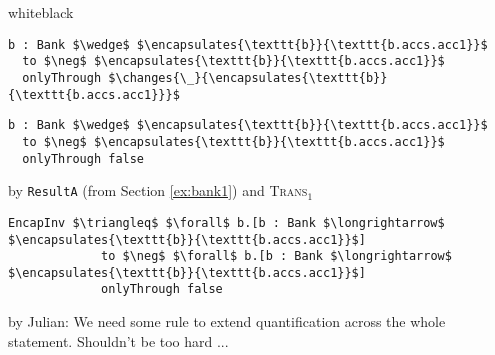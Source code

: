 \begin{proofBox}{white}{black}
\footnotesize
\begin{minipage}{0.75\textwidth}
\begin{lstlisting}[language = Chainmail, mathescape=true, frame=single]
b : Bank $\wedge$ $\encapsulates{\texttt{b}}{\texttt{b.accs.acc1}}$
  to $\neg$ $\encapsulates{\texttt{b}}{\texttt{b.accs.acc1}}$
  onlyThrough $\changes{\_}{\encapsulates{\texttt{b}}{\texttt{b.accs.acc1}}}$
\end{lstlisting}
\end{minipage}
\begin{minipage}{0.24\textwidth}
\end{minipage}
\begin{minipage}{0.75\textwidth}
\begin{lstlisting}[language = Chainmail, mathescape=true]
b : Bank $\wedge$ $\encapsulates{\texttt{b}}{\texttt{b.accs.acc1}}$
  to $\neg$ $\encapsulates{\texttt{b}}{\texttt{b.accs.acc1}}$
  onlyThrough false
\end{lstlisting}
\end{minipage}
\begin{minipage}{0.24\textwidth}
\scriptsize
\hfill by \texttt{ResultA} (from Section \ref{ex:bank1}) and \textsc{Trans}$_1$
\end{minipage}
\begin{minipage}{0.75\textwidth}
\begin{lstlisting}[language = Chainmail, mathescape=true]
EncapInv $\triangleq$ $\forall$ b.[b : Bank $\longrightarrow$ $\encapsulates{\texttt{b}}{\texttt{b.accs.acc1}}$]
             to $\neg$ $\forall$ b.[b : Bank $\longrightarrow$ $\encapsulates{\texttt{b}}{\texttt{b.accs.acc1}}$]
             onlyThrough false
\end{lstlisting}
\end{minipage}
\begin{minipage}{0.24\textwidth}
\scriptsize
\hfill by {\color{red}Julian: We need some rule to extend quantification across the whole statement. Shouldn't be too hard ...}
\end{minipage}
\end{proofBox}

